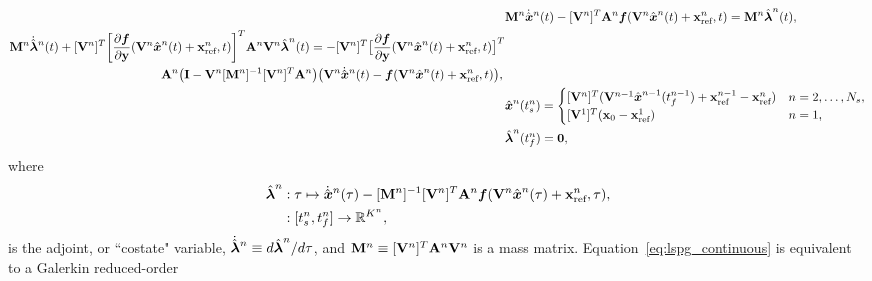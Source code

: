 \begin{align}\label{eq:lspg_continuous} 
&\massArg{n}   \genstateDotArg{n}{t}  -  [\basisspaceArg{n}]^T
\stweightingMatArgt{n}{t} \velocity(\veloargsromn) =  \massArg{n} \adjointArg{n}{t} , \\
\begin{split}
 &\massArg{n}  \adjointDotArg{n}{t}  + [\basisspaceArg{n}]^T \bigg[\frac{\partial
\velocity}{\partial \stateyDiscrete} (\veloargsromn) \bigg]^T \stweightingMatArgt{n}{t} \basisspaceArg{n}
 \adjointArg{n}{t} = -[\basisspaceArg{n}]^T \big[
\frac{\partial \velocity}{\partial \stateyDiscrete}(\veloargsromn) \big]^T \\& \hspace{1.7 in} \stweightingMatArgt{n}{t} \big( \mathbf{I} -
\basisspaceArg{n} [\massArg{n}]^{-1} [\basisspaceArg{n}]^T \stweightingMatArgt{n}{t} \big)
 \big( \basisspaceArg{n} \genstateDotArg{n}{t} -
\velocity(\veloargsromn) \big), \label{eq:lspg_adjoint}
\end{split}
 \\ &
\genstateArg{n}{\timeStartArg{n}} = \begin{cases}
\spatialIC & n=2,\ldots,\nslabs, \label{eq:lspg_bcs1}\\
\genstateICOne & n=1, \end{cases}\\ &
\adjointArg{n}{\timeEndArg{n}} = \boldsymbol 0, \label{eq:lspg_bcs} 
\end{align}
where 
\begin{equation}\label{eq:costate_def}
\begin{split}
\hat{\boldsymbol \lambda}^{n} &: \tau \mapsto \dot{\hat{ \boldsymbol x}}^{n}(\tau)  -  [\mathbf{M}^{n}]^{-1} [\mathbf {V}^{n}]^T \mathbf{A}^{n}\boldsymbol f(\mathbf {V}^{n} \hat{ \boldsymbol x}^{n}(\tau) + \mathbf{x}_\text{ref}^{n} , \tau ) ,\\
&: [t_s^{n},t_f^{n}] \rightarrow \mathbb{R}^{K^{n}} ,
\end{split}
\end{equation}
is the adjoint, or ``costate" variable, $\dot{\hat{\boldsymbol \lambda}}^{n} \equiv d \hat{\boldsymbol \lambda}^{n}/ d\tau$, and $\mathbf{M}^{n} \equiv [\mathbf {V}^{n}]^T \mathbf{A}^{n} \mathbf {V}^{n}$ is a mass matrix. 
Equation~\eqref{eq:lspg_continuous} is equivalent to a Galerkin reduced-order
